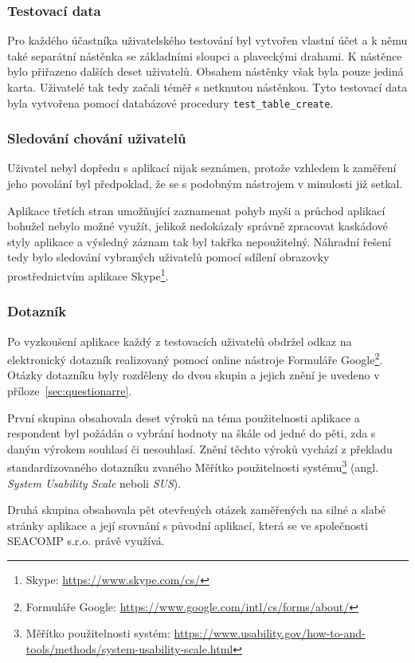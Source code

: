 \subsubsection{Testovací data}
Pro každého účastníka uživatelského testování byl vytvořen vlastní účet a k němu také separátní nástěnka se základními sloupci a plaveckými drahami. K nástěnce bylo přiřazeno dalších deset uživatelů. Obsahem nástěnky však byla pouze jediná karta. Uživatelé tak tedy začali téměř s netknutou nástěnkou. Tyto testovací data byla vytvořena pomocí databázové procedury \texttt{test\_table\_create}.

\subsubsection{Sledování chování uživatelů}
Uživatel nebyl dopředu s aplikací nijak seznámen, protože vzhledem k zaměření jeho povolání byl předpoklad, že se s podobným nástrojem v minulosti již setkal. 

Aplikace třetích stran umožňující zaznamenat pohyb myši a průchod aplikací bohužel nebylo možné využít, jelikož nedokázaly správně zpracovat kaskádové styly aplikace a výsledný záznam tak byl takřka nepoužitelný. Náhradní řešení tedy bylo sledování vybraných uživatelů pomocí sdílení obrazovky prostřednictvím aplikace Skype\footnote{Skype: \url{https://www.skype.com/cs/}}.

\subsubsection{Dotazník}
Po vyzkoušení aplikace každý z testovacích uživatelů obdržel odkaz na elektronický dotazník realizovaný pomocí online nástroje Formuláře Google\footnote{Formuláře Google: \url{https://www.google.com/intl/cs/forms/about/}}. Otázky dotazníku byly rozděleny do dvou skupin a jejich znění je uvedeno v příloze~\ref{sec:questionarre}.

První skupina obsahovala deset výroků na téma použitelnosti aplikace a respondent byl požádán o vybrání hodnoty na škále od jedné do pěti, zda s daným výrokem souhlasí či nesouhlasí. Znění těchto výroků vychází z překladu standardizovaného dotazníku zvaného Měřítko použitelnosti systému\footnote{Měřítko použitelnosti systém: \url{https://www.usability.gov/how-to-and-tools/methods/system-usability-scale.html}} (angl. \emph{System Usability Scale} neboli \emph{SUS}).

Druhá skupina obsahovala pět otevřených otázek zaměřených na silné a slabé stránky aplikace a její srovnání s původní aplikací, která se ve společnosti SEACOMP s.r.o. právě využívá.



